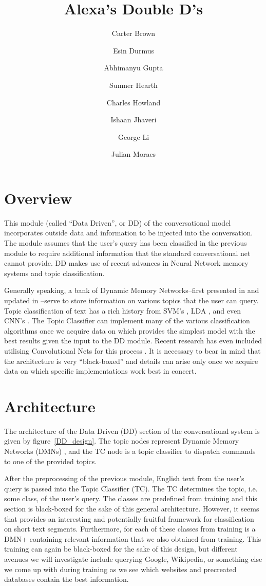 \documentclass[10pt,twoside,twocolumn]{article}
\title{Alexa's Double D's}
\author{Carter Brown \and Esin Durmus \and Abhimanyu Gupta \and Sumner Hearth \and Charles Howland \and Ishaan Jhaveri \and George Li \and Julian Moraes}
\date{} %
\begin{document}
\maketitle

\section{Overview}
This module (called ``Data Driven'', or DD) of the conversational model incorporates outside data and information to be injected into the conversation. The module assumes that the user's query has been classified in the previous module to require additional information that the standard conversational net cannot provide. DD makes use of recent advances in Neural Network memory systems and topic classification.

\noindent
Generally speaking, a bank of Dynamic Memory Networks--first presented in \cite{Kumar:2015} and updated in \cite{Xiong2016}--serve to store information on various topics that the user can query. Topic classification of text has a rich history from SVM's \cite{Joachims1998, Pilaszy2005}, LDA \cite{Blei2001, Zhao2011}, and even CNN's \cite{Kim2014}. The Topic Classifier can implement many of the various classification algorithms once we acquire data on which provides the simplest model with the best results given the input to the DD module. Recent research has even included utilising Convolutional Nets for this process \cite{Kim2014}. It is necessary to bear in mind that the architecture is very ``black-boxed'' and details can arise only once we acquire data on which specific implementations work best in concert.

\section{Architecture}
The architecture of the Data Driven (DD) section of the conversational system is given by figure~\ref{DD_design}. The topic nodes represent Dynamic Memory Networks (DMNs) \cite{Kumar:2015, Xiong2016}, and the TC node is a topic classifier to dispatch commands to one of the provided topics.

\noindent
After the preprocessing of the previous module, English text from the user's query is passed into the Topic Classifier (TC). The TC determines the topic, i.e. some class, of the user's query. The classes are predefined from training and this section is black-boxed for the sake of this general architecture. However, it seems that \cite{Zhao2011} provides an interesting and potentially fruitful framework for classification on short text segments. Furthermore, for each of these classes from training is a DMN+ \cite{Xiong2016} containing relevant information that we also obtained from training. This training can again be black-boxed for the sake of this design, but different avenues we will investigate include querying Google, Wikipedia, or something else we come up with during training as we see which websites and precreated databases contain the best information.
\end{document}
